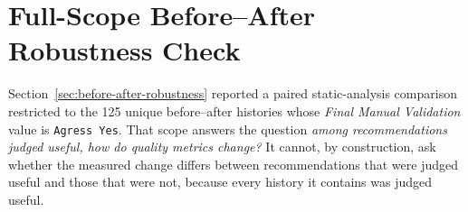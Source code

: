 %
%
%
%
%
%

\section{Full-Scope Before--After Robustness Check}
\label{sec:before-after-full}

Section~\ref{sec:before-after-robustness} reported a paired static-analysis comparison restricted to the 125 unique before--after histories whose \emph{Final Manual Validation} value is \texttt{Agress Yes}.
That scope answers the question \emph{among recommendations judged useful, how do quality metrics change?}
It cannot, by construction, ask whether the measured change differs between recommendations that were judged useful and those that were not, because every history it contains was judged useful.

